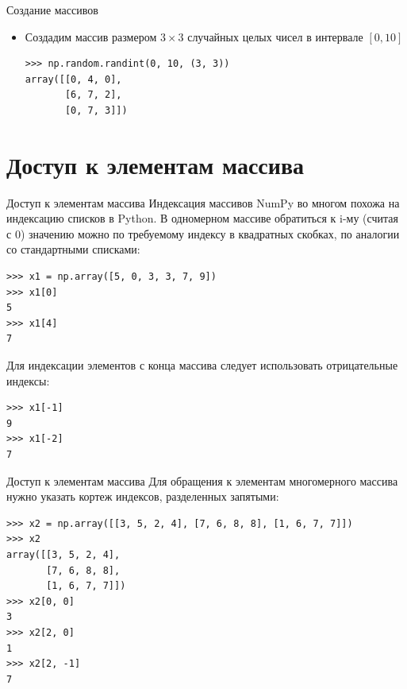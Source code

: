 \documentclass[aspectratio=169, mathserif]{beamer}	%
\begin{document}
\begin{frame}[fragile]{Создание массивов}
\scriptsize
\begin{itemize}
	\item Создадим массив размером $3 \times 3$ случайных целых чисел в интервале $\left[0, 10\right]$	
\begin{verbatim}
>>> np.random.randint(0, 10, (3, 3))
array([[0, 4, 0],
       [6, 7, 2],
       [0, 7, 3]])
\end{verbatim}
\end{itemize}
\vfill
\end{frame}

\section{Доступ к элементам массива}
\begin{frame}[fragile]{Доступ к элементам массива}
\scriptsize
Индексация массивов NumPy во многом похожа на индексацию списков в Python.
В одномерном массиве обратиться к $\mathrm{i}$-му (считая с $0$) значению можно по требуемому индексу в квадратных скобках, по аналогии со стандартными списками:

\begin{verbatim}
>>> x1 = np.array([5, 0, 3, 3, 7, 9])
>>> x1[0]
5
>>> x1[4]
7
\end{verbatim}

Для индексации элементов с конца массива следует использовать отрицательные индексы:

\begin{verbatim}
>>> x1[-1]
9
>>> x1[-2]
7
\end{verbatim}
\end{frame}

\begin{frame}[fragile]{Доступ к элементам массива}
\scriptsize
Для обращения к элементам многомерного массива нужно указать кортеж индексов, разделенных запятыми:
\begin{verbatim}
>>> x2 = np.array([[3, 5, 2, 4], [7, 6, 8, 8], [1, 6, 7, 7]])
>>> x2
array([[3, 5, 2, 4],
       [7, 6, 8, 8],
       [1, 6, 7, 7]])
>>> x2[0, 0]
3
>>> x2[2, 0]
1
>>> x2[2, -1]
7
\end{verbatim}
\end{frame}
\end{document}
